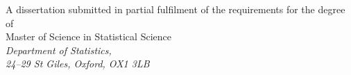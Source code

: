 \documentclass[a4paper,11pt,openany,extrafontsizes]{memoir}
\begin{document}
\begin{titlingpage}
\begin{center}
    \vfill
    \large{A dissertation submitted in partial fulfilment of the requirements for the degree of\\
      Master of Science in Statistical Science}\\
    \vspace{.5cm}
    \large{\emph{Department of Statistics,\\ 24--29 St Giles, Oxford, OX1 3LB}}\\
    \vspace{1cm} \large{\thedate}
  \end{center}
\end{titlingpage}


\frontmatter

\cleardoublepage%
\end{document}
